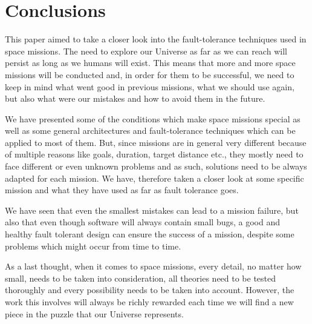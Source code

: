 \section{Conclusions}
This paper aimed to take a closer look into the fault-tolerance techniques used
in space missions. The need to explore our Universe as far as we can reach will
persist as long as we humans will exist. This means that more and more space
missions will be conducted and, in order for them to be successful, we need to
keep in mind what went good in previous missions, what we should use again, but
also what were our mistakes and how to avoid them in the future.

We have presented some of the conditions which make space missions special as
well as some general architectures and fault-tolerance techniques which can be
applied to most of them. But, since missions are in general very different
because of multiple reasons like goals, duration, target distance etc., they
mostly need to face different or even unknown problems and as such, solutions
need to be always adapted for each mission. We have, therefore taken a closer
look at some specific mission and what they have used as far as fault tolerance
goes.

We have seen that even the smallest mistakes can lead to a mission failure, but
also that even though software will always contain small bugs, a good and
healthy fault tolerant design can ensure the success of a mission, despite some
problems which might occur from time to time.

As a last thought, when it comes to space missions, every detail, no matter how
small, needs to be taken into consideration, all theories need to be tested
thoroughly and every possibility needs to be taken into account. However, the
work this involves will always be richly rewarded each time we will find a new
piece in the puzzle that our Universe represents.
